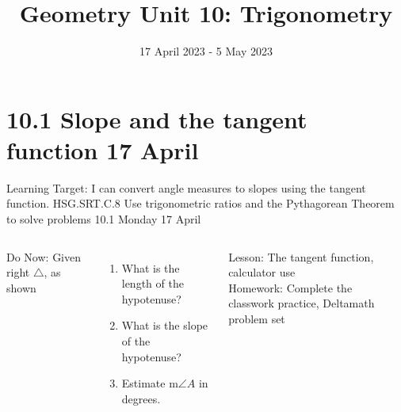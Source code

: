 \documentclass[onlytextwidth, aspectratio=169]{beamer}
\title{Geometry Unit 10: Trigonometry}
\date{17 April 2023 - 5 May 2023}
\begin{document}
\frame{\titlepage}
\section[Outline]{}
\frame{\tableofcontents}

\section{10.1 Slope and the tangent function \hfill 17 April \,}
\begin{frame}{Learning Target: I can convert angle measures to slopes using the tangent function.}
  {HSG.SRT.C.8 Use trigonometric ratios and the Pythagorean Theorem to solve problems \hfill \alert{10.1 Monday 17 April}}
  \begin{columns}
    Do Now: Given right $\triangle$, as shown
    \begin{enumerate}
      \item What is the length of the hypotenuse?
      \item What is the slope of the hypotenuse?
      \item Estimate m$\angle A$ in degrees.
    \end{enumerate} \vspace{0.5cm}
    Lesson: The tangent function, calculator use \\[0.5cm]
    Homework: Complete the classwork practice, Deltamath problem set
    \begin{flushright}
    \end{flushright}
  \end{columns}
\end{frame}
\end{document}
